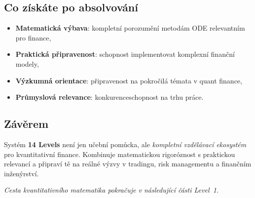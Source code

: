 \spc

\subsection*{Co získáte po absolvování}
\label{sec:co-ziskate}
\begin{itemize}
  \item \textbf{Matematická výbava}: kompletní porozumění metodám ODE relevantním pro finance,
  \item \textbf{Praktická připravenost}: schopnost implementovat komplexní finanční modely,
  \item \textbf{Výzkumná orientace}: připravenost na pokročilá témata v quant finance,
  \item \textbf{Průmyslová relevance}: konkurenceschopnost na trhu práce.
\end{itemize}

\subsection*{Závěrem}
Systém \textbf{14 Levels} není jen učební pomůcka, ale \emph{kompletní vzdělávací ekosystém} pro kvantitativní finance.
Kombinuje matematickou rigoróznost s praktickou relevancí a připraví tě na reálné výzvy v tradingu, risk managementu
a finančním inženýrství.

\spc

\noindent\emph{Cesta kvantitativního matematika pokračuje v následující části Level~1.}
